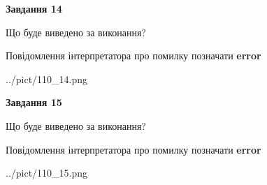 \documentclass[11pt, ukrainian]{article}
\begin{document}
{\begin {large}
{\begin {center}\textbf{Завдання 14}\end {center}}\par
Що буде виведено за виконання? \par
Повідомлення інтерпретатора про помилку позначати \textbf{error}

\begin{center}
	{../pict/110_14.png}
\end{center}
\newpage

{\begin {center}\textbf{Завдання 15}\end {center}}\par
Що буде виведено за виконання? \par
Повідомлення інтерпретатора про помилку позначати \textbf{error}

\begin{center}
	{../pict/110_15.png}
\end{center}
\newpage

\end {large}}
\end{document}
